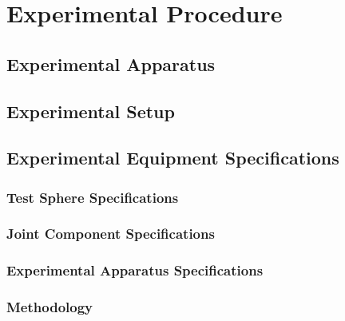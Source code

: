 \chapter{Experimental Procedure}


\section{Experimental Apparatus}


\section{Experimental Setup}


\section{Experimental Equipment Specifications}


\subsection{Test Sphere Specifications}


\subsection{Joint Component Specifications}


\subsection{Experimental Apparatus Specifications}


\subsection{Methodology}